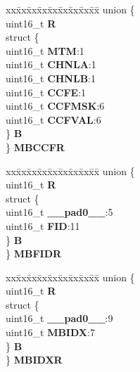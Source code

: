 \begin{DoxyCompactItemize}
\begin{tabbing}
\end{tabbing}\item 
\mbox{\label{structuMSG__BUFF__CCS_a825693b7d7719f0d22df4ca7be335e4a}} 
\begin{tabbing}
xx\=xx\=xx\=xx\=xx\=xx\=xx\=xx\=xx\=\kill
union \{\\
\>uint16\_t {\bfseries R}\\
\>struct \{\\
\>\>uint16\_t {\bfseries MTM}:1\\
\>\>uint16\_t {\bfseries CHNLA}:1\\
\>\>uint16\_t {\bfseries CHNLB}:1\\
\>\>uint16\_t {\bfseries CCFE}:1\\
\>\>uint16\_t {\bfseries CCFMSK}:6\\
\>\>uint16\_t {\bfseries CCFVAL}:6\\
\>\} {\bfseries B}\\
\} {\bfseries MBCCFR}\\

\end{tabbing}\item 
\mbox{\label{structuMSG__BUFF__CCS_a2a6e75a9c2199788c8d28bed203ee247}} 
\begin{tabbing}
xx\=xx\=xx\=xx\=xx\=xx\=xx\=xx\=xx\=\kill
union \{\\
\>uint16\_t {\bfseries R}\\
\>struct \{\\
\>\>uint16\_t {\bfseries \_\_pad0\_\_}:5\\
\>\>uint16\_t {\bfseries FID}:11\\
\>\} {\bfseries B}\\
\} {\bfseries MBFIDR}\\

\end{tabbing}\item 
\mbox{\label{structuMSG__BUFF__CCS_a08a7134e6796d8a16342f2702de68eab}} 
\begin{tabbing}
xx\=xx\=xx\=xx\=xx\=xx\=xx\=xx\=xx\=\kill
union \{\\
\>uint16\_t {\bfseries R}\\
\>struct \{\\
\>\>uint16\_t {\bfseries \_\_pad0\_\_}:9\\
\>\>uint16\_t {\bfseries MBIDX}:7\\
\>\} {\bfseries B}\\
\} {\bfseries MBIDXR}\\


\end{tabbing}
\end{DoxyCompactItemize}
